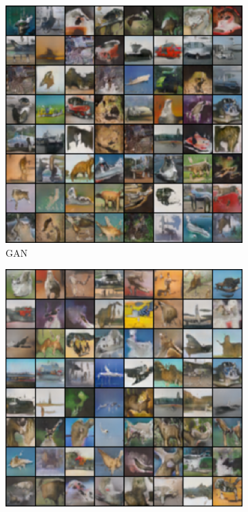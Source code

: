 \begin{figure}[htbp]
    \centering
    \begin{subfigure}[b]{0.49\textwidth}
       \centering
       \includegraphics[width=\exfactor\textwidth]{figures/cifar/192_base_raw_base_smaller_bigger.png}
       \caption{GAN}
    \end{subfigure}
    \begin{subfigure}[b]{0.49\textwidth}
       \centering
       \includegraphics[width=\exfactor\textwidth]{figures/cifar/192_base_raw_reject_smaller_bigger.png}

\end{subfigure}
\end{figure}
